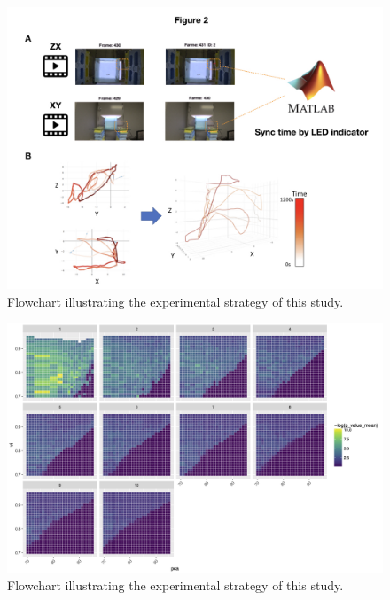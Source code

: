 \documentclass[fleqn,10pt]{wlscirep}
\begin{document}
\begin{figure}[ht]
\centering
\includegraphics[width=\linewidth]{Figure_2.jpeg}
\caption{Flowchart illustrating the experimental strategy of this study.}
\label{fig:sync}
\end{figure}

\begin{figure}[ht]
\centering
\includegraphics[width=\linewidth]{Figure_3.png}
\caption{Flowchart illustrating the experimental strategy of this study.}
\label{fig:heatmap}
\end{figure}
\end{document}
